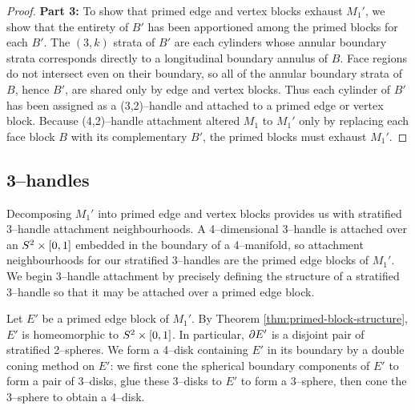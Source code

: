 \begin{proof}
	

	\textbf{Part 3:}
	To show that primed edge and vertex blocks exhaust $M_1'$, we show that the entirety of $B'$ has been apportioned among the primed blocks for each $B'$.
	The $(3,k)$ strata of $B'$ are each cylinders whose annular boundary strata corresponds directly to a longitudinal boundary annulus of $B$.
	Face regions do not intersect even on their boundary, so all of the annular boundary strata of $B$, hence $B'$, are shared only by edge and vertex blocks.
	Thus each cylinder of $B'$ has been assigned as a (3,2)--handle and attached to a primed edge or vertex block.
	Because (4,2)--handle attachment altered $M_1$ to $M_1'$ only by replacing each face block $B$ with its complementary $B'$, the primed blocks must exhaust $M_1'$.
\end{proof}

\subsection{3--handles}
\label{subsec:smooth-3handles}

Decomposing $M_1'$ into primed edge and vertex blocks provides us with stratified 3--handle attachment neighbourhoods.
A 4--dimensional 3--handle is attached over an $S^2\times[0,1]$ embedded in the boundary of a 4--manifold, so attachment neighbourhoods for our stratified 3--handles are the primed edge blocks of $M_1'$.
We begin 3--handle attachment by precisely defining the structure of a stratified 3--handle so that it may be attached over a primed edge block.

Let $E'$ be a primed edge block of $M_1'$.
By Theorem \ref{thm:primed-block-structure}, $E'$ is homeomorphic to $S^2\times[0,1]$.
In particular, $\partial E'$ is a disjoint pair of stratified 2--spheres.
We form a 4--disk containing $E'$ in its boundary by a double coning method on $E'$: we first cone the spherical boundary components of $E'$ to form a pair of 3--disks, glue these 3--disks to $E'$ to form a 3--sphere, then cone the 3--sphere to obtain a 4--disk.

